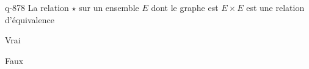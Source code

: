 \begin{truefalse}{q-878}
La relation $\star$ sur un ensemble $E$ dont le graphe est $E\times E$ est une relation d'équivalence
\item* Vrai
\item Faux
\end{truefalse}

